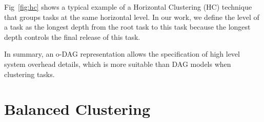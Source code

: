 \documentclass[final]{IEEEtran}
\begin{document}

Fig~\ref{fig:hc} shows a typical example of a Horizontal Clustering (HC) technique that groups tasks at the same horizontal level. In our work, we define the level of a task as the longest depth from the root task to this task because the longest depth controls the final release of this task. 


In summary, an o-DAG representation allows the specification of high level system overhead details, which is more suitable than DAG models when clustering tasks.

\section{Balanced Clustering}
\label{sec:heuristics}
\end{document}
